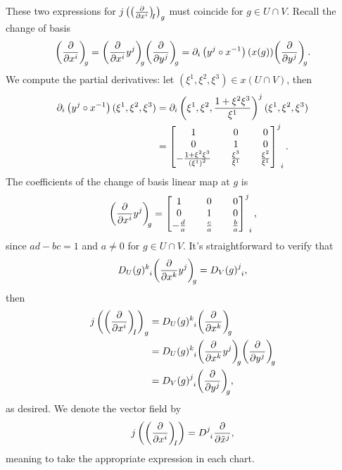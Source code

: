 These two expressions for \(j\left(\bvec{x^i}{I}\right)_g\) must coincide for \(g \in U \cap V\). Recall the change of basis
\begin{equation*}
    \bvec{x^i}{g} = \bvec[y^j]{x^i}{g} \bvec{y^j}{g} = \partial_i\left(y^j \circ x^{-1}\right)(x(g))\bvec{y^j}{g}.
\end{equation*}
We compute the partial derivatives: let \((\xi^1, \xi^2, \xi^3) \in x(U\cap V)\), then
\begin{align*}
    \partial_i\left(y^j \circ x^{-1}\right)(\xi^1, \xi^2, \xi^3) &= \partial_i\left(\xi^1, \xi^2, \frac{1+\xi^2\xi^3}{\xi^1}\right)^j(\xi^1, \xi^2, \xi^3)\\
                                                                 &= \begin{bmatrix}
                                                                     1 && 0 && 0\\
                                                                     0 && 1 && 0\\
                                                                     -\frac{1 +\xi^2\xi^3}{\left(\xi^1\right)^2} && \frac{\xi^3}{\xi^1} && \frac{\xi^2}{\xi^1}
                                                                 \end{bmatrix}\indices{^j_i}.
\end{align*}
The coefficients of the change of basis linear map at \(g\) is
\begin{equation*}
    \bvec[y^j]{x^i}{g} = \begin{bmatrix}
        1 && 0 && 0\\
        0 && 1 && 0\\
        -\frac{d}{a} && \frac{c}{a} && \frac{b}{a}
    \end{bmatrix}\indices{^j_i},
\end{equation*}
since \(ad - bc = 1\) and \(a \neq 0\) for \(g \in U\cap V\). It's straightforward to verify that
\begin{equation*}
    {D_U}(g)\indices{^k_i}\bvec[y^j]{x^k}{g} = {D_V}(g)\indices{^j_i},
\end{equation*}
then
\begin{align*}
    j\left(\bvec{x^i}{I}\right)_g &= D_U(g)\indices{^k_i} \bvec{x^k}{g}\\
                                  &= D_U(g)\indices{^k_i} \bvec[y^j]{x^k}{g} \bvec{y^j}{g}\\
                                  &= D_V(g)\indices{^j_i}\bvec{y^j}{g},
\end{align*}
as desired. We denote the vector field by
\begin{equation*}
    j\left(\bvec{x^i}{I}\right) = D\indices{^j_i}\bfield{\tilde{x}^j},
\end{equation*}
meaning to take the appropriate expression in each chart.

